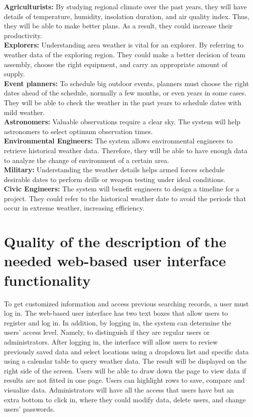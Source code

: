 \documentclass[]{article}
\begin{document}
	\noindent \textbf{Agriculturists:} By studying regional climate over the past years, they will have details of temperature, humidity, insolation duration, and air quality index. Thus, they will be able to make better plans. As a result, they could increase their productivity.  \\

	\noindent \textbf{Explorers:} Understanding area weather is vital for an explorer. By referring to weather data of the exploring region. They could make a better decision of team assembly, choose the right equipment, and carry an appropriate amount of supply.\\

	\noindent \textbf{Event planners:} To schedule big outdoor events, planners must choose the right dates ahead of the schedule, normally a few months, or even years in some cases. They will be able to check the weather in the past years to schedule dates with mild weather.\\

	\noindent \textbf{Astronomers:} Valuable observations require a clear sky. The system will help astronomers to select optimum observation times.\\

	\noindent \textbf{Environmental Engineers:} The system allows environmental engineers to retrieve historical weather data. Therefore, they will be able to have enough data to analyze the change of environment of a certain area.\\

	\noindent \textbf{Military:} Understanding the weather details helps armed forces schedule desirable dates to perform drills or weapon testing under ideal conditions.\\

	\noindent \textbf{Civic Engineers:} The system will benefit engineers to design a timeline for a project. They could refer to the historical weather date to avoid the periods that occur in extreme weather, increasing efficiency.

\section{Quality of the description of the needed web-based user interface functionality}

	To get customized information and access previous searching records, a user must log in. The web-based user interface has two text boxes that allow users to register and log in. In addition, by logging in, the system can determine the users’ access level. Namely, to distinguish if they are regular users or administrators. After logging in, the interface will allow users to review previously saved data and select locations using a dropdown list and specific data using a calendar table to query weather data. The result will be displayed on the right side of the screen. Users will be able to draw down the page to view data if results are not fitted in one page. Users can highlight rows to save, compare and visualize data. Administrators will have all the access that users have but an extra bottom to click in, where they could modify data, delete users, and change users’ passwords.
\end{document}
